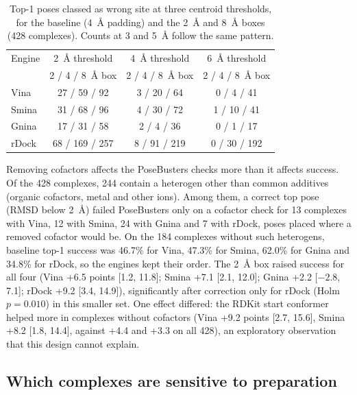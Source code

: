 \begin{table}[h]
  \centering
  \caption{Top-1 poses classed as wrong site at three centroid thresholds, for the baseline
    (\SI{4}{\angstrom} padding) and the \SI{2}{\angstrom} and \SI{8}{\angstrom} boxes (428
    complexes). Counts at 3 and \SI{5}{\angstrom} follow the same pattern.}
  \label{tab:threshold}
  \small
  \begin{tabular}{lccc}
    \toprule
    Engine & \SI{2}{\angstrom} threshold & \SI{4}{\angstrom} threshold & \SI{6}{\angstrom} threshold \\
     & 2 / 4 / \SI{8}{\angstrom} box & 2 / 4 / \SI{8}{\angstrom} box & 2 / 4 / \SI{8}{\angstrom} box \\
    \midrule
    Vina & 27 / 59 / 92 & 3 / 20 / 64 & 0 / 4 / 41 \\
    Smina & 31 / 68 / 96 & 4 / 30 / 72 & 1 / 10 / 41 \\
    Gnina & 17 / 31 / 58 & 2 / 4 / 36 & 0 / 1 / 17 \\
    rDock & 68 / 169 / 257 & 8 / 91 / 219 & 0 / 30 / 192 \\
    \bottomrule
  \end{tabular}
\end{table}

Removing cofactors affects the PoseBusters checks more than it affects success. Of the 428
complexes, 244 contain a heterogen other than common additives (organic cofactors, metal
and other ions). Among them, a correct top pose (RMSD below \SI{2}{\angstrom}) failed
PoseBusters only on a cofactor check for 13 complexes with Vina, 12 with Smina, 24 with Gnina
and 7 with rDock, poses placed where a removed cofactor would be. On the 184 complexes
without such heterogens, baseline top-1 success was 46.7\% for Vina, 47.3\% for Smina,
62.0\% for Gnina and 34.8\% for rDock, so the engines kept their order. The
\SI{2}{\angstrom} box raised success for all four (Vina +6.5 points [1.2, 11.8]; Smina +7.1
[2.1, 12.0]; Gnina +2.2 [$-2.8$, 7.1]; rDock +9.2 [3.4, 14.9]), significantly after
correction only for rDock (Holm $p = 0.010$) in this smaller set. One effect differed: the
RDKit start conformer helped more in complexes without cofactors (Vina +9.2 points
[2.7, 15.6], Smina +8.2 [1.8, 14.4], against +4.4 and +3.3 on all 428), an exploratory
observation that this design cannot explain.

\subsection{Which complexes are sensitive to preparation}

